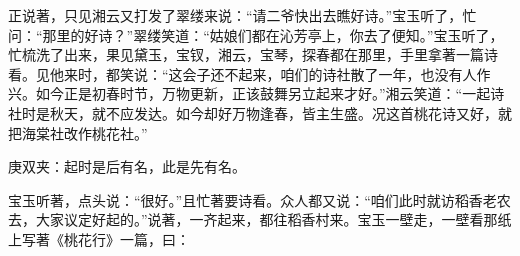 \begin{parag}
    正说著，只见湘云又打发了翠缕来说：“请二爷快出去瞧好诗。”宝玉听了，忙问：“那里的好诗？”翠缕笑道：“姑娘们都在沁芳亭上，你去了便知。”宝玉听了，忙梳洗了出来，果见黛玉，宝钗，湘云，宝琴，探春都在那里，手里拿著一篇诗看。见他来时，都笑说：“这会子还不起来，咱们的诗社散了一年，也没有人作兴。如今正是初春时节，万物更新，正该鼓舞另立起来才好。”湘云笑道：“一起诗社时是秋天，就不应发达。如今却好万物逢春，皆主生盛。况这首桃花诗又好，就把海棠社改作桃花社。”\begin{note}庚双夹：起时是后有名，此是先有名。\end{note}宝玉听著，点头说：“很好。”且忙著要诗看。众人都又说：“咱们此时就访稻香老农去，大家议定好起的。”说著，一齐起来，都往稻香村来。宝玉一壁走，一壁看那纸上写著《桃花行》一篇，曰：
\end{parag}



